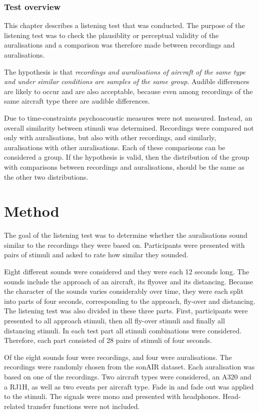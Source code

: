 \subsubsection*{Test overview}
This chapter describes a listening test that was conducted. The purpose of the
listening test was to check the plausiblity or perceptual validity of the
auralisations and a comparison was therefore made between recordings and
auralisations.

The hypothesis is that \emph{recordings and auralisations of aircraft of the same
type and under similar conditions are samples of the same group}.
Audible differences are likely to occur and are also acceptable, because even
among recordings of the same aircraft type there are audible differences.

Due to time-constraints psychoacoustic measures were not measured. Instead, an
overall similarity between stimuli was determined. Recordings were compared not
only with auralisations, but also with other recordings, and similarly,
auralisations with other auralisations. Each of these comparisons can be
considered a group. If the hypothesis is valid, then the distribution of the
group with comparisons between recordings and auralisations, should be the same
as the other two distributions.


\section{Method}

The goal of the listening test was to determine whether the auralisations sound
similar to the recordings they were based on. Participants were presented with
pairs of stimuli and asked to rate how similar they sounded.

Eight different sounds were considered and they were each 12 seconds long. The
sounds include the approach of an aircraft, its flyover and its distancing.
Because the character of the sounds varies considerably over time, they were
each split into parts of four seconds, corresponding to the approach, fly-over
and distancing. The listening test was also divided in these three parts. First,
participants were presented to all approach stimuli, then all fly-over stimuli
and finally all distancing stimuli. In each test part all stimuli combinations
were considered. Therefore, each part consisted of 28 pairs of stimuli of four
seconds.

Of the eight sounds four were recordings, and four were auralisations.
The recordings were randomly chosen from the sonAIR dataset. Each
auralisation was based on one of the recordings. Two aircraft types were
considered, an A320 and a RJ1H, as well as two events per aircraft type.
Fade in and fade out was applied to the stimuli. The signals were mono and
presented with headphones. Head-related transfer functions were not included.

